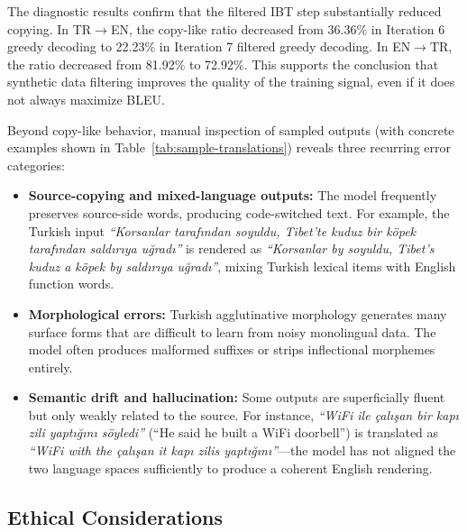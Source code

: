 \documentclass[runningheads]{llncs}
\begin{document}
The diagnostic results confirm that the filtered IBT step substantially reduced copying. In TR$\rightarrow$EN, the copy-like ratio decreased from 36.36\% in Iteration 6 greedy decoding to 22.23\% in Iteration 7 filtered greedy decoding. In EN$\rightarrow$TR, the ratio decreased from 81.92\% to 72.92\%. This supports the conclusion that synthetic data filtering improves the quality of the training signal, even if it does not always maximize BLEU.

Beyond copy-like behavior, manual inspection of sampled outputs (with concrete examples shown in Table~\ref{tab:sample-translations}) reveals three recurring error categories:
\begin{itemize}
    \item \textbf{Source-copying and mixed-language outputs:} The model frequently preserves source-side words, producing code-switched text. For example, the Turkish input \textit{``Korsanlar taraf\i{}ndan soyuldu, Tibet'te kuduz bir k\"opek taraf\i{}ndan sald\i{}r\i{}ya u\u{g}rad\i{}''} is rendered as \textit{``Korsanlar by soyuldu, Tibet's kuduz a k\"opek by sald\i{}r\i{}ya u\u{g}rad\i{}''}, mixing Turkish lexical items with English function words.
    \item \textbf{Morphological errors:} Turkish agglutinative morphology generates many surface forms that are difficult to learn from noisy monolingual data. The model often produces malformed suffixes or strips inflectional morphemes entirely.
    \item \textbf{Semantic drift and hallucination:} Some outputs are superficially fluent but only weakly related to the source. For instance, \textit{``WiFi ile \c{c}al\i{}\c{s}an bir kap\i{} zili yapt\i{}\u{g}\i{}n\i{} s\"oyledi''} (``He said he built a WiFi doorbell'') is translated as \textit{``WiFi with the \c{c}al\i{}\c{s}an it kap\i{} zilis yapt\i{}\u{g}\i{}n\i{}''}---the model has not aligned the two language spaces sufficiently to produce a coherent English rendering.
\end{itemize}

\subsection{Ethical Considerations}
\end{document}
